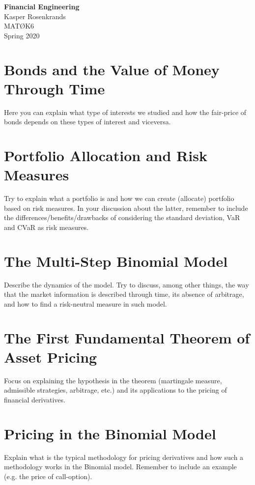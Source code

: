 \documentclass{article}
\numberwithin{equation}{section}
\begin{document}
\begin{titlepage}
    \begin{center}
        {\huge\textbf{Financial Engineering}}\\[2mm]
        {\Large Kasper Rosenkrands}\\[2cm]
        {\large MATØK6}\\[2mm]
        {\large Spring 2020}
    \end{center}
    
    \vfill
\end{titlepage}

\section{Bonds and the Value of Money Through Time}
Here you can explain what type of interests we studied and how the fair-price of bonds depends on these types of interest and viceversa.

\newpage

\section{Portfolio Allocation and Risk Measures}
Try to explain what a portfolio is and how we can create (allocate) portfolio based on risk measures. In your discussion about the latter, remember to include the differences/benefits/drawbacks of considering the standard deviation, VaR and CVaR as risk measures.

\newpage

\section{The Multi-Step Binomial Model}
Describe the dynamics of the model. Try to discuss, among other things, the way that the market information is described through time, its absence of arbitrage, and how to find a risk-neutral measure in such model. 

\newpage

\section{The First Fundamental Theorem of Asset Pricing}
Focus on explaining the hypothesis in the theorem (martingale measure, admissible strategies, arbitrage, etc.) and its applications to the pricing of financial derivatives.

\newpage

\section{Pricing in the Binomial Model}
Explain what is the typical methodology for pricing derivatives and how such a methodology works in the Binomial model. Remember to include an example (e.g. the price of call-option).
\end{document}
